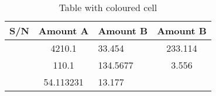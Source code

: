 \documentclass{article}
\begin{document}
	\begin{table}[h!]
		\begin{center}
		\caption{Table with coloured cell}
		\label{tab:table1}
		\begin{tabular}{l|S|s|c|} %
			\hline
			\textbf{S/N} & \textbf{Amount A} & \textbf{Amount B} & \textbf{Amount B}\\
			\hline
			 & 4210.1 & 33.454 & 233.114\\
			 & 110.1 & 134.5677 & 3.556\\ 
			 & 54.113231 & 13.177\\
			\hline
		\end{tabular}
	\end{center}
\end{table}
\end{document}
